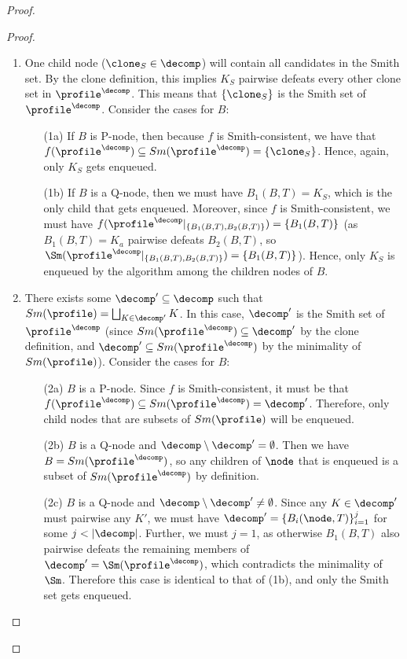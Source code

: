 \begin{proof}
\begin{proof}
    \begin{enumerate}
        \item One child node ($\clone_S \in \decomp$) will contain all candidates in the Smith set. By the clone definition, this implies $K_S$ pairwise defeats every other clone set in $\profile^\decomp$. This means that $\{\clone_S\}$ is the Smith set of $\profile^\decomp$. Consider the cases for $B$: 
        \begin{enumerate}
            \item[(1a)] If $B$ is P-node, then because $f$ is Smith-consistent, we have that $f(\profile^\decomp) \subseteq Sm(\profile^\decomp) = \{\clone_S\}$. Hence, again, only $K_S$ gets enqueued.
            \item[(1b)] If $B$ is a Q-node, then we must have $B_1(B,T)=K_S$, which is the only child that gets enqueued. Moreover, since $f$ is Smith-consistent, we must have $f(\profile^\decomp|_{\{B_1(B,T),B_2(B,T)\}})=\{B_1(B,T)\}$ (as $B_1(B,T)=K_a$ pairwise defeats $B_2(B,T)$, so $\Sm(\profile^\decomp|_{\{B_1(B,T),B_2(B,T)\}})=\{B_1(B,T)\}$). Hence, only $K_S$ is enqueued by the algorithm among the children nodes of $B$.
        \end{enumerate} 
        \item There exists some $\decomp' \subseteq \decomp$ such that $Sm(\profile)=\bigsqcup_{K \in \decomp'} K$. In this case, $\decomp'$ is the Smith set of $\profile^\decomp$ (since $Sm(\profile^\decomp) \subseteq \decomp'$ by the clone definition, and $\decomp' \subseteq Sm(\profile^\decomp)$ by the minimality of $Sm(\profile)$). Consider the cases for $B$: \begin{enumerate}
            \item[(2a)] $B$ is a P-node. Since $f$ is Smith-consistent, it must be that $f(\profile^\decomp) \subseteq Sm(\profile^\decomp)=\decomp'$. Therefore, only child nodes that are subsets of $Sm(\profile)$ will be enqueued. 
            \item[(2b)]  $B$ is a Q-node and $\decomp \setminus \decomp'=\emptyset$. Then we have $B=Sm(\profile^\decomp)$, so any children of $\node$ that is enqueued is a subset of $Sm(\profile^\decomp)$ by definition.
            \item[(2c)]  $B$ is a Q-node and $\decomp \setminus \decomp' \neq \emptyset$. Since any $K \in \decomp'$ must pairwise any $K'$, we must have $\decomp' = \{B_i(\node, T)\}_{i=1}^j$ for some $j < |\decomp|$. Further, we must $j=1$, as otherwise $B_1(B,T)$ also pairwise defeats the remaining members of $\decomp'= \Sm(\profile^\decomp)$, which contradicts the minimality of $\Sm$. Therefore this case is identical to that of (1b), and only the Smith set gets enqueued. 
        \end{enumerate} 
    \end{enumerate}


\end{proof}
\end{proof}
